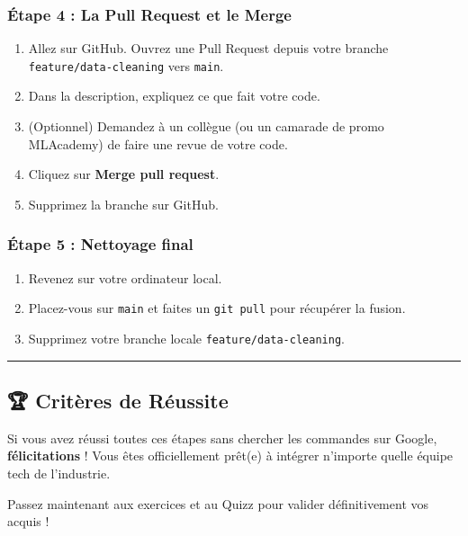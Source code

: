 \documentclass[
  letterpaper,
  DIV=11,
  numbers=noendperiod]{scrreprt}
\providecommand{\tightlist}{%
  \setlength{\itemsep}{0pt}\setlength{\parskip}{0pt}}
\begin{document}
\subsubsection{Étape 4 : La Pull Request et le
Merge}\label{uxe9tape-4-la-pull-request-et-le-merge}

\begin{enumerate}
\def\labelenumi{\arabic{enumi}.}
\tightlist
\item
  Allez sur GitHub. Ouvrez une Pull Request depuis votre branche
  \texttt{feature/data-cleaning} vers \texttt{main}.
\item
  Dans la description, expliquez ce que fait votre code.
\item
  (Optionnel) Demandez à un collègue (ou un camarade de promo MLAcademy)
  de faire une revue de votre code.
\item
  Cliquez sur \textbf{Merge pull request}.
\item
  Supprimez la branche sur GitHub.
\end{enumerate}

\subsubsection{Étape 5 : Nettoyage
final}\label{uxe9tape-5-nettoyage-final}

\begin{enumerate}
\def\labelenumi{\arabic{enumi}.}
\tightlist
\item
  Revenez sur votre ordinateur local.
\item
  Placez-vous sur \texttt{main} et faites un \texttt{git\ pull} pour
  récupérer la fusion.
\item
  Supprimez votre branche locale \texttt{feature/data-cleaning}.
\end{enumerate}

\begin{center}\rule{0.5\linewidth}{0.5pt}\end{center}

\subsection{🏆 Critères de Réussite}\label{crituxe8res-de-ruxe9ussite}

Si vous avez réussi toutes ces étapes sans chercher les commandes sur
Google, \textbf{félicitations} ! Vous êtes officiellement prêt(e) à
intégrer n'importe quelle équipe tech de l'industrie.

Passez maintenant aux exercices et au Quizz pour valider définitivement
vos acquis !
\end{document}
